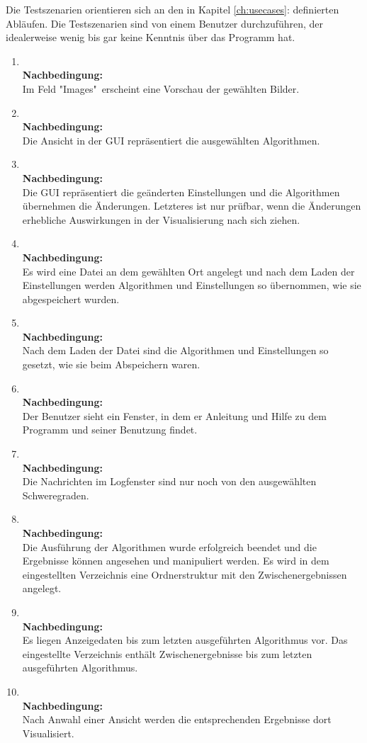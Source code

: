 Die Testszenarien orientieren sich an den in Kapitel \ref{ch:usecases}:  definierten Abläufen. Die Testszenarien sind von einem Benutzer durchzuführen, der idealerweise wenig bis gar keine Kenntnis über das Programm hat.
\begin{enumerate}[align=left, leftmargin=4em, label={\textbf{\textbackslash T4.\arabic*\textbackslash}} ]
\newcommand{\testsz}[1]{
	\item \textbf{\usecaseTitle{#1}}\\
	\usecase{#1}
	\textbf{Nachbedingung:}\\
}

\testsz{1} Im Feld "{}Images" erscheint eine Vorschau der gewählten Bilder.
\testsz{2} Die Ansicht in der GUI repräsentiert die ausgewählten Algorithmen.
\testsz{3} Die GUI repräsentiert die geänderten Einstellungen und die Algorithmen übernehmen die Änderungen. Letzteres ist nur prüfbar, wenn die Änderungen erhebliche Auswirkungen in der Visualisierung nach sich ziehen.
\testsz{4} Es wird eine Datei an dem gewählten Ort angelegt und nach dem Laden der Einstellungen
werden Algorithmen und Einstellungen so übernommen, wie sie abgespeichert wurden.
\testsz{5} Nach dem Laden der Datei sind die Algorithmen und Einstellungen so gesetzt, wie sie beim Abspeichern waren.
\testsz{6} Der Benutzer sieht ein Fenster, in dem er Anleitung und Hilfe zu dem Programm und seiner Benutzung findet.
\testsz{7} Die Nachrichten im Logfenster sind nur noch von den ausgewählten Schweregraden.
\testsz{8} Die Ausführung der Algorithmen wurde erfolgreich beendet und die Ergebnisse können angesehen und manipuliert werden. Es wird in dem eingestellten Verzeichnis eine Ordnerstruktur mit den Zwischenergebnissen angelegt.
\testsz{9} Es liegen Anzeigedaten bis zum letzten ausgeführten Algorithmus vor. Das eingestellte Verzeichnis enthält Zwischenergebnisse bis zum letzten ausgeführten Algorithmus.
\testsz{10} Nach Anwahl einer Ansicht werden die entsprechenden Ergebnisse dort Visualisiert.
\end{enumerate}